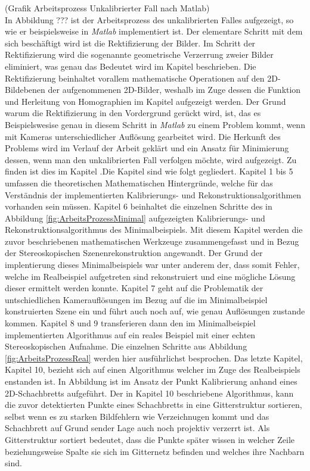(Grafik Arbeitsprozess Unkalibrierter Fall nach Matlab) \\


In Abbildung ??? ist der Arbeitsprozess des unkalibrierten Falles aufgezeigt, so wie er beispielsweise in \textit{Matlab} implementiert ist. Der elementare Schritt mit dem sich beschäftigt wird ist die Rektifizierung der Bilder. Im Schritt der Rektifizierung wird die sogenannte geometrische Verzerrung zweier Bilder eliminiert, was genau das Bedeutet wird im Kapitel  beschrieben. Die Rektifizierung beinhaltet vorallem mathematische Operationen auf den 2D-Bildebenen der aufgenommenen 2D-Bilder, weshalb im Zuge dessen die Funktion und Herleitung von Homographien im Kapitel  aufgezeigt werden. Der Grund warum die Rektifizierung in den Vordergrund gerückt wird, ist, das es Beispielswesise genau in diesem Schritt in \textit{Matlab} zu einem Problem kommt, wenn mit Kameras unterschiedlicher Auflösung gearbeitet wird. Die Herkunft des Problems wird im Verlauf der Arbeit geklärt und ein Ansatz für Minimierung dessen, wenn man den unkalibrierten Fall verfolgen möchte, wird aufgezeigt. Zu finden ist dies im Kapitel .Die Kapitel sind wie folgt gegliedert. Kapitel 1 bis 5 umfassen die theoretischen Mathematischen Hintergründe, welche für das Verständnis der implementierten Kalibrierungs- und Rekonstruktionsalgorithmen vorhanden sein müssen. Kapitel 6 beinhaltet die einzelnen Schritte des in Abbildung \ref{fig:ArbeitsProzessMinimal} aufgezeigten Kalibrierungs- und Rekonstruktionsalgorithmus des Minimalbeispiels. Mit diesem Kapitel werden die zuvor beschriebenen mathematischen Werkzeuge zusammengefasst und in Bezug der Stereoskopischen Szenenrekonstruktion angewandt. Der Grund der implentierung dieses Minimalbeispiels war unter anderem der, dass somit Fehler, welche im Realbeispiel aufgetreten sind rekonstruiert und eine mögliche Lösung dieser ermittelt werden konnte. Kapitel 7 geht auf die Problematik der untschiedlichen Kamerauflösungen im Bezug auf die im Minimalbeispiel konstruierten Szene ein und führt auch noch auf, wie genau Auflösungen zustande kommen. Kapitel 8 und 9 transferieren dann den im Minimalbeispiel implementierten Algorithmus auf ein reales Beispiel mit einer echten Stereoskopischen Aufnahme. Die einzelnen Schritte aus Abbildung \ref{fig:ArbeitsProzessReal} werden hier ausführlichst besprochen. Das letzte Kapitel, Kapitel 10, bezieht sich auf einen Algorithmus welcher im Zuge des Realbeispiels enstanden ist. In Abbildung  ist im Ansatz der Punkt Kalibrierung anhand eines 2D-Schachbretts aufgeführt. Der in Kapitel 10 beschriebene Algorithmus, kann die zuvor detektierten Punkte eines Schachbretts in eine Gitterstruktur sortieren, selbst wenn es zu starken Bildfehlern wie Verzeichnugen kommt und das Schachbrett auf Grund sender Lage auch noch projektiv verzerrt ist. Als Gitterstruktur sortiert bedeutet, dass die Punkte später wissen in welcher Zeile beziehungsweise Spalte sie sich im Gitternetz befinden und welches ihre Nachbarn sind. 

